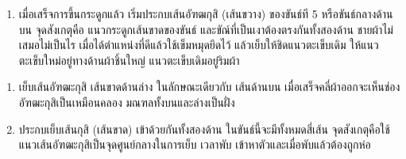 \setlength{\nextPhotoWidth}{0.5\textwidth}



\begin{enumerate}
\def\labelenumi{(\arabic{enumi})}
\setcounter{enumi}{1}
\tightlist
\item
  เมื่อเสร็จการขึ้นกระดูกแล้ว เริ่มประกบเส้นอัฑฒกุสิ (เส้นขวาง) ของขันธ์ที 5
  หรือขันธ์กลางด้านบน จุดสังเกตุคือ แนวกระดูกเส้นขาดของขันธ์
  และขัณ์ที่เป็นเงาต้องตรงกันทั้งสองด้าน ชายผ้าไม่เสมอไม่เป็นไร
  เมื่อได้ตำแหน่งที่ดีแล้วใช้เข็มหมุดยึดไว้ แล้วเย็บให้ชิดแนวตะเข็บเดิม
  ให้แนวตะเข็บใหม่อยู่ทางด้านผ้าชิ้นใหญ่ แนวตะเข็บเดิมอยู่ริมผ้า
\end{enumerate}

\setlength{\nextPhotoWidth}{0.45\textwidth}



\setlength{\nextPhotoWidth}{0.45\textwidth}



\setlength{\nextPhotoWidth}{0.45\textwidth}



\setlength{\nextPhotoWidth}{0.45\textwidth}



\begin{enumerate}
\def\labelenumi{(\arabic{enumi})}
\setcounter{enumi}{2}
\item
  เย็บเส้นอัฑฒะกุสิ เส้นขาดด้านล่าง ในลักษณะเดียวกับ เส้นด้านบน
  เมื่อเสร็จคลี่ผ้าออกจะเห็นช่อง อัฑฒะกุสิเป็นเหมือนคลอง มณฑลทั้งบนและล่างเป็นฝั่ง
\item
  ประกบเย็บเส้นกุสิ (เส้นขาด) เข้าด้วยกันทั้งสองด้าน ในขันธ์นี้จะมีทั้งหมดสี่เส้น
  จุดสังเกตุคือใช้แนวเส้นอัฑฒะกุสิเป็นจุดศูนย์กลางในการเย็บ เวลาพับ
  เข้าหาตัวและเมื่อพับแล้วต้องถูกห่อ
\end{enumerate}

